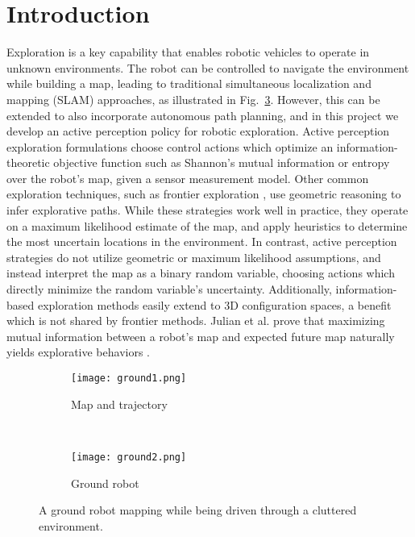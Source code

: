 \section{Introduction}
\label{sec:introduction}

Exploration is a key capability that enables robotic vehicles to operate in
unknown environments. The robot can be controlled to navigate the environment while building a map, leading to traditional simultaneous localization and mapping (SLAM) approaches, as illustrated in Fig.~\ref{fig:ground_bot}. However, this can be extended to also incorporate autonomous path planning, and in this project we develop an active perception policy
for robotic exploration. Active perception exploration formulations
choose control actions which optimize an information-theoretic objective
function such as Shannon's mutual information or entropy
\cite{bourgault2002information, stachniss2005information} over the robot's map,
given a sensor measurement model. Other common exploration techniques, such as frontier
exploration \cite{}, use geometric reasoning to infer explorative paths.
While these strategies work well in practice, they operate on a
maximum likelihood estimate of the map, and apply heuristics to determine the most uncertain
locations in the environment. In contrast, active perception strategies do not utilize
geometric or maximum likelihood assumptions, and instead interpret the map as a binary
random variable, choosing actions which directly minimize the random variable's uncertainty.
Additionally, information-based exploration methods easily extend to 3D
configuration spaces, a benefit which is not shared by frontier methods.
Julian et al. prove that maximizing mutual information between a
robot's map and expected future map naturally yields explorative behaviors
\cite{julian2013mutual}.

\begin{figure}[t]
  \centering
  \begin{subfigure}{0.47\textwidth}
    \centering
    \texttt{[image: ground1.png]}
    \caption{Map and trajectory\label{fig:ground_bot1}}
  \end{subfigure}
  ~
  \begin{subfigure}{0.47\textwidth}
    \centering
    \texttt{[image: ground2.png]}
    \caption{Ground robot\label{fig:ground_bot2}}
  \end{subfigure}
  \caption{A ground robot mapping while being driven through a cluttered environment.\label{fig:ground_bot}}
\end{figure}

